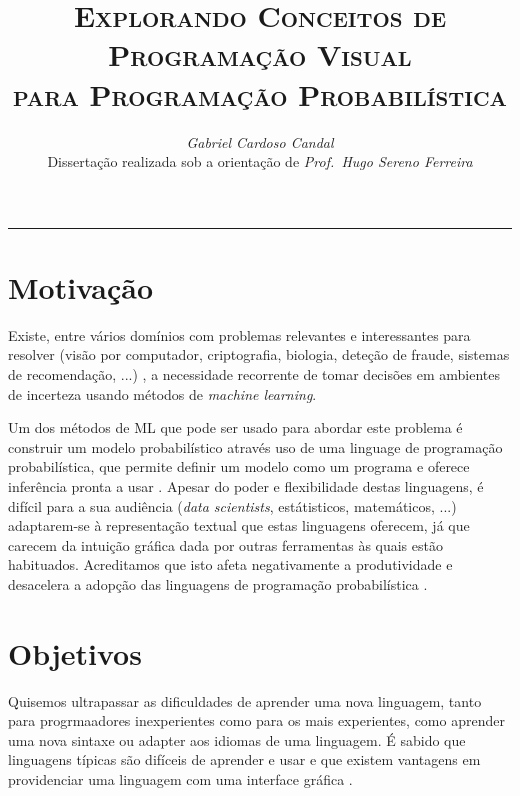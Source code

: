 \documentclass[9pt,a4paper]{extarticle}
\begin{document}
\title{\vspace*{-8mm}\textbf{\textsc{Explorando Conceitos de Programação Visual\\para Programação Probabilística}}}
\author{\emph{Gabriel Cardoso Candal}\\[2mm]
\small{Dissertação realizada sob a orientação de \emph{Prof.\ Hugo Sereno Ferreira}}}
\date{}
\maketitle
\thispagestyle{empty}

\vspace*{-4mm}\noindent\rule{\textwidth}{0.4pt}\vspace*{4mm}

\begin{multicols}{2}

\section{Motivação}

Existe, entre vários domínios com problemas relevantes e interessantes para resolver
(visão por computador, criptografia, biologia, deteção de fraude, sistemas de recomendação,
...) \cite{intml}, a necessidade recorrente de tomar decisões em ambientes de incerteza
usando métodos de \textit{machine learning}.

Um dos métodos de ML que pode ser usado para abordar este problema é construir um
modelo probabilístico através uso de uma linguage de programação probabilística,
que permite definir um modelo como um programa e oferece inferência pronta a usar \cite{Prekopa2003}.
Apesar do poder e flexibilidade destas linguagens, é difícil para a sua audiência
(\textit{data scientists}, estátisticos, matemáticos, ...) adaptarem-se à representação
textual que estas linguagens oferecem, já que carecem da intuição gráfica dada
por outras ferramentas às quais estão habituados. Acreditamos que isto afeta
negativamente a produtividade e desacelera a adopção das linguagens de programação
probabilística \cite{darpa}.

\section{Objetivos}

Quisemos ultrapassar as dificuldades de aprender uma nova linguagem, tanto para
progrmaadores inexperientes como para os mais experientes, como aprender
uma nova sintaxe ou adapter aos idiomas de uma linguagem. É sabido que linguagens
típicas são difíceis de aprender e usar \cite{Lewis1987} e que existem vantagens em providenciar
uma linguagem com uma interface gráfica \cite{dfbeg}.


\end{multicols}
\end{document}
